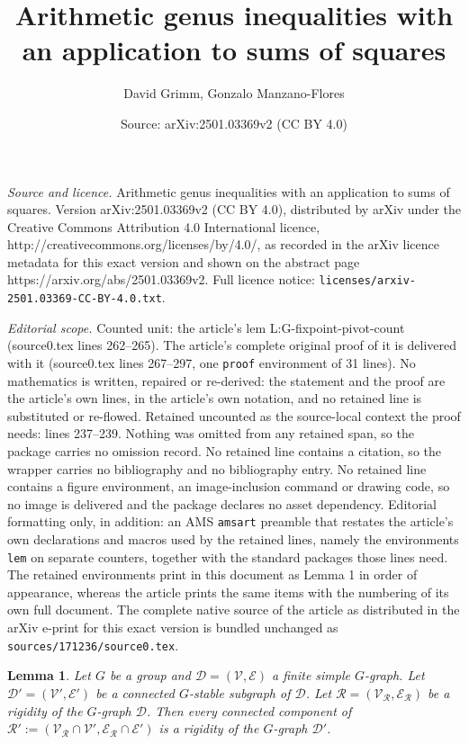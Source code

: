 \documentclass[10pt,a4paper]{amsart}
\title{Arithmetic genus inequalities with an application to sums of squares}
\author{David Grimm, Gonzalo Manzano-Flores}
\date{Source: arXiv:2501.03369v2 (CC BY 4.0)}
\newtheorem{lem}{Lemma}
\begin{document}
\maketitle

\noindent\emph{Source and licence.} Arithmetic genus inequalities with an application to sums of squares. Version arXiv:2501.03369v2 (CC BY 4.0), distributed by arXiv under the Creative Commons Attribution 4.0 International licence, http://creativecommons.org/licenses/by/4.0/, as recorded in the arXiv licence metadata for this exact version and shown on the abstract page https://arxiv.org/abs/2501.03369v2. Full licence notice: \texttt{licenses/arxiv-2501.03369-CC-BY-4.0.txt}.\par\smallskip

\noindent\textit{Editorial scope.} Counted unit: the article's lem L:G-fixpoint-pivot-count (source0.tex lines 262--265). The article's complete original proof of it is delivered with it (source0.tex lines 267--297, one \texttt{proof} environment of 31 lines). No mathematics is written, repaired or re-derived: the statement and the proof are the article's own lines, in the article's own notation, and no retained line is substituted or re-flowed.  Retained uncounted as the source-local context the proof needs: lines 237--239.  Nothing was omitted from any retained span, so the package carries no omission record.  No retained line contains a citation, so the wrapper carries no bibliography and no bibliography entry.  No retained line contains a figure environment, an image-inclusion command or drawing code, so no image is delivered and the package declares no asset dependency.  Editorial formatting only, in addition: an AMS \texttt{amsart} preamble that restates the article's own declarations and macros used by the retained lines, namely the environments \texttt{lem} on separate counters, together with the standard packages those lines need.  The retained environments print in this document as Lemma 1 in order of appearance, whereas the article prints the same items with the numbering of its own full document.  The complete native source of the article as distributed in the arXiv e-print for this exact version is bundled unchanged as \texttt{sources/171236/source0.tex}.
\begin{lem}\label{restricting rigidities}
   Let $G$ be a group and $\mathcal{D}=(\mathcal{V},\mathcal{E})$ a finite simple $G$-graph. Let $\mathcal{D}'=(\mathcal{V}',\mathcal{E}')$ be a connected $G$-stable subgraph of $\mathcal{D}$. Let $\mathcal{R}=(\mathcal{V}_\mathcal{R},\mathcal{E}_\mathcal{R})$ be a rigidity of the $G$-graph $\mathcal{D}$. Then every connected component of $\mathcal{R}':=(\mathcal{V}_{\mathcal{R}} \cap \mathcal{V}' ,  \mathcal{E}_\mathcal{R}\cap \mathcal{E}')$ is a rigidity of the $G$-graph $\mathcal{D}'$.
\end{lem}
\end{document}
